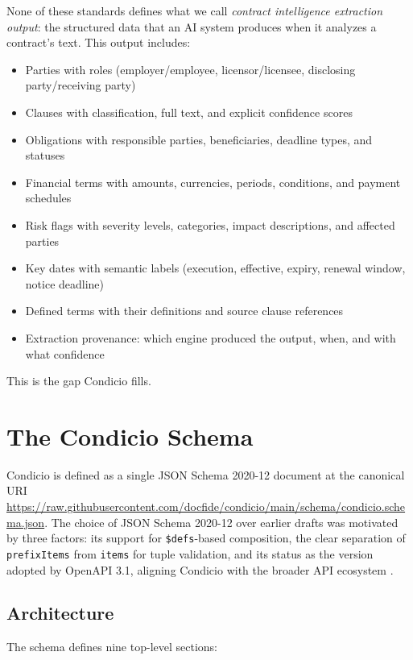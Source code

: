 \documentclass[11pt,a4paper]{article}
\begin{document}
None of these standards defines what we call \emph{contract intelligence extraction output}: the structured data that an AI system produces when it analyzes a contract's text. This output includes:

\begin{itemize}[noitemsep]
  \item Parties with roles (employer/employee, licensor/licensee, disclosing party/receiving party)
  \item Clauses with classification, full text, and explicit confidence scores
  \item Obligations with responsible parties, beneficiaries, deadline types, and statuses
  \item Financial terms with amounts, currencies, periods, conditions, and payment schedules
  \item Risk flags with severity levels, categories, impact descriptions, and affected parties
  \item Key dates with semantic labels (execution, effective, expiry, renewal window, notice deadline)
  \item Defined terms with their definitions and source clause references
  \item Extraction provenance: which engine produced the output, when, and with what confidence
\end{itemize}

This is the gap Condicio fills.

\section{The Condicio Schema}

Condicio is defined as a single JSON Schema 2020-12 document at the canonical URI \url{https://raw.githubusercontent.com/docfide/condicio/main/schema/condicio.schema.json}. The choice of JSON Schema 2020-12 over earlier drafts was motivated by three factors: its support for \texttt{\$defs}-based composition, the clear separation of \texttt{prefixItems} from \texttt{items} for tuple validation, and its status as the version adopted by OpenAPI 3.1, aligning Condicio with the broader API ecosystem \cite{json-schema-2020-12}.

\subsection{Architecture}

The schema defines nine top-level sections:
\end{document}
